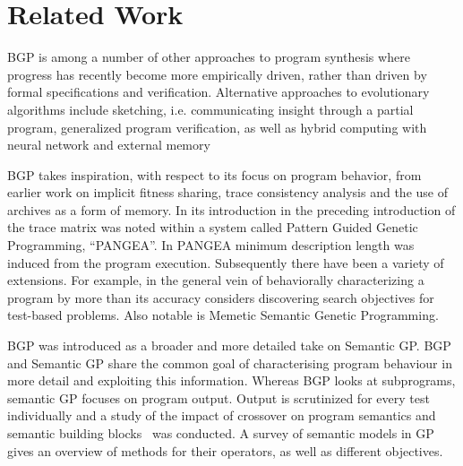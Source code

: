 \section{Related Work}
\label{sec:related-work}

BGP is among a number of other approaches to program synthesis where progress has recently become more empirically driven, rather than driven by formal specifications and verification\cite{Basin04synthesisof}.
Alternative approaches to evolutionary algorithms include sketching\cite{solar2008program}, i.e. communicating insight through a partial program, generalized program verification\cite{srivastava2010program}, as well as hybrid computing with neural network and external memory\cite{graves2016hybrid}

BGP takes inspiration, with respect to its focus on program behavior, from earlier work on implicit fitness
sharing\cite{mckay2000fitness}, trace consistency analysis and the use of archives as a form of memory\cite{haynes1997line}. 
In its introduction in \cite{krawiec2013pattern} the preceding introduction of
the trace matrix was noted within a system called Pattern Guided Genetic Programming, ``PANGEA''. 
In PANGEA  minimum description length was induced from the program execution.
Subsequently there have been a variety of extensions. For example, in the general
vein of behaviorally characterizing a program by more than its
accuracy \cite{liskowski2016online} considers discovering search objectives for test-based
problems. Also notable is Memetic Semantic Genetic
Programming\cite{Ffrancon:2015:MSG:2739480.2754697}.

BGP was introduced as a broader and more detailed take on Semantic GP. BGP and Semantic GP share the common goal of
characterising program behaviour in more detail and exploiting this
information. Whereas BGP looks at subprograms, semantic GP focuses on
program output.  Output is scrutinized for every test individually and a study of the impact of crossover on program semantics
and semantic building blocks~\cite{mcphee2008semantic} was conducted. A survey of
semantic models in GP~\cite{vanneschi2014survey} gives an overview of
methods for their operators, as well as different objectives.

